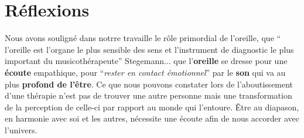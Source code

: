 



 





\chapter{Réflexions}






Nous avons souligné dans notrre travaille le rôle primordial de
l'oreille, que `` l'oreille est l'organe le plus sensible des
sens et l'instrument de diagnostic le plus important du
musicothérapeute'' Stegemann...
que l'\textbf{oreille }se dresse pour une\textbf{ écoute} empathique, pour ``\textit{rester en contact émotionnel}'' par le \textbf{son} qui va au plus \textbf{profond de
  l'être}.
Ce que nous pouvons constater lors de l'aboutissement
d'une thérapie n'est pas de trouver une autre personne mais une transformation
de la perception de celle-ci par rapport au monde qui l'entoure.
Être au diapason, en harmonie avec soi et les autres, nécessite une
écoute afin de nous accorder avec l'univers.


